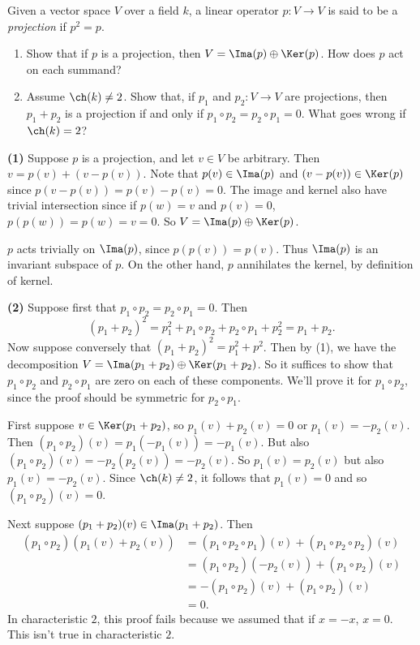 \begin{problem}
Given a vector space $V$ over a field $k$, a linear operator $p:V\to V$ is said to be a {\em projection} if $p^2=p$.  
\begin{enumerate}
  \item Show that if $p$ is a projection, then $V=\Ima (p)\oplus \Ker(p)$. How does $p$ act on each summand?
  \item Assume $\ch(k)\neq 2$. Show that, if $p_1$ and $p_2:V\to V$ are projections, then $p_1+p_2$ is a projection if and only if $p_1\circ p_2 = p_2\circ p_1=0$.
  What goes wrong if $\ch(k)=2$?
\end{enumerate}
\end{problem}
\textbf{(1)} Suppose $p$ is a projection, and let $v\in V$ be arbitrary. Then $v=p(v)+(v-p(v))$. Note that $p(v)\in \Ima (p)$ and $(v-p(v))\in \Ker (p)$ since $p(v-p(v))=p(v)-p(v)=0$. The image and kernel also have trivial intersection since if $p(w)=v$ and $p(v)=0$, $p(p(w))=p(w)=v=0$. So $V=\Ima(p)\oplus \Ker(p)$.

$p$ acts trivially on $\Ima(p)$, since $p(p(v))=p(v)$. Thus $\Ima(p)$ is an invariant subspace of $p$. On the other hand, $p$ annihilates the kernel, by definition of kernel.         

\textbf{(2)} Suppose first that $p_1\circ p_2=p_2\circ p_1=0$. Then
\[
  (p_1+p_2)^2=p_1^2+p_1\circ p_2+p_2\circ p_1+p_2^2=p_1+p_2
.\]
Now suppose conversely that $(p_1+p_2)^2=p_1^2+p^2$. Then by (1), we have the decomposition $V=\Ima(p_1+p_2)\oplus\Ker(p_1+p_2)$. So it suffices to show that $p_1\circ p_2$ and $p_2\circ p_1$ are zero on each of these components. We'll prove it for $p_1\circ p_2$, since the proof should be symmetric for $p_2\circ p_1$. 

First suppose $v\in \Ker(p_1+p_2)$, so $p_1(v)+p_2(v)=0$ or $p_1(v)=-p_2(v)$. Then $(p_1\circ p_2)(v)=p_1(-p_1(v))=-p_1(v)$. But also $(p_1\circ p_2)(v)=-p_2(p_2(v))=-p_2(v)$. So $p_1(v)=p_2(v)$ but also $p_1(v)=-p_2(v)$. Since $\ch(k)\neq 2$, it follows that $p_1(v)=0$ and so $(p_1\circ p_2)(v)=0$.   

Next suppose $(p_1+p_2)(v)\in \Ima(p_1+p_2)$. Then
\begin{align*}
  (p_1\circ p_2)(p_1(v)+ p_2(v))&=(p_1\circ p_2\circ p_1)(v)+(p_1\circ p_2\circ p_2)(v)\\
  &= (p_1\circ p_2)(-p_2(v))+(p_1\circ p_2)(v)\\
  &= -(p_1\circ p_2)(v)+(p_1\circ p_2)(v)\\
  &=0.
\end{align*}
In characteristic $2$, this proof fails because we assumed that if $x=-x$, $x=0$. This isn't true in characteristic $2$.     